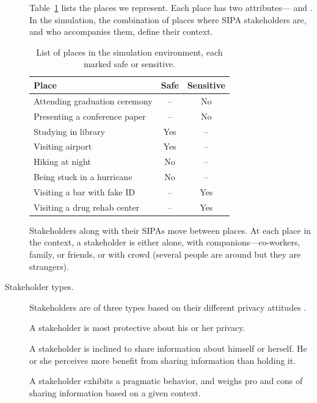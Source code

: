 \begin{description}
Table~\ref{tab:places} lists the places we represent. Each place has two attributes--- and . In the simulation, the combination of places where SIPA stakeholders are, and who accompanies them, define their context.

\begin{table}[!htb]
\centering
\caption[List of places in the simulation environment]{List of places in the simulation environment, each marked safe or sensitive.}
\label{tab:places}
\begin{tabular}{lcc}
\toprule
Place & Safe & Sensitive \\\midrule
\rowcolor{lightgray!50!}
Attending graduation ceremony & -- & No \\
Presenting a conference paper & -- & No \\
\rowcolor{lightgray!50!}
Studying in library & Yes & -- \\
Visiting airport & Yes & -- \\
\rowcolor{lightgray!50!}
Hiking at night & No & -- \\
Being stuck in a hurricane & No & -- \\
\rowcolor{lightgray!50!}
Visiting a bar with fake ID & -- & Yes \\
Visiting a drug rehab center & -- & Yes \\
\bottomrule
\end{tabular}
\end{table}

Stakeholders along with their SIPAs move between places. At each place in the context, a stakeholder is either alone, with companions---co-workers, family, or friends, or with crowd (several people are around but they are strangers). 

\item[Stakeholder types.] Stakeholders are of three types based on their different privacy attitudes \citet{westin2003social}. 

A  stakeholder is most protective about his or her privacy. 

A  stakeholder is inclined to share information about himself or herself. He or she perceives more benefit from sharing information than holding it. 

A  stakeholder exhibits a pragmatic behavior, and weighs pro and cons of sharing information based on a given context. 

\end{description}

